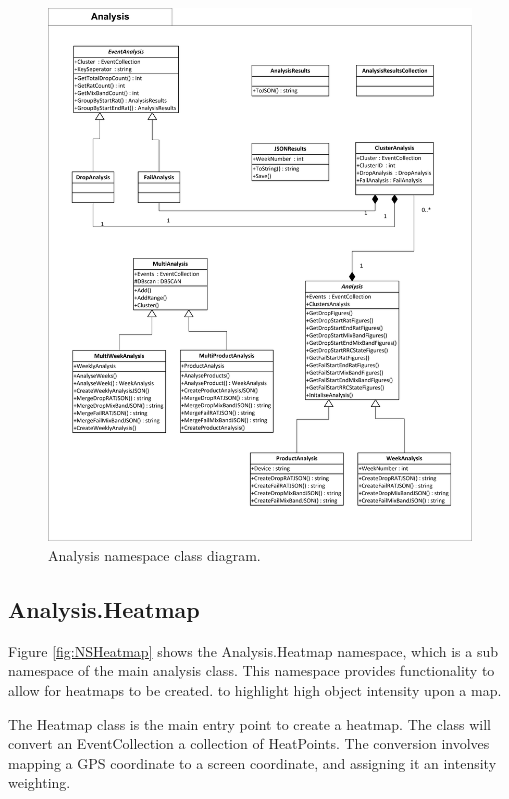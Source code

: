 \begin{figure}[H]
  \centering
    \includegraphics[scale=0.9]{chapter7/class_diagrams/analysis_namespace.png}
    \caption[Analysis namespace class diagram]
            {Analysis namespace class diagram.}
    \label{fig:NSAnalysis}
\end{figure}



\subsection{Analysis.Heatmap}
Figure \ref{fig:NSHeatmap} shows the Analysis.Heatmap namespace, which is a 
sub namespace of the main analysis class. This namespace provides functionality 
to allow for heatmaps to be created. to highlight high object intensity upon a 
map.

The Heatmap class is the main entry point to create a heatmap. The class will 
convert an EventCollection a collection of HeatPoints. The conversion involves 
mapping a GPS coordinate to a screen coordinate, and assigning it an intensity 
weighting. 

